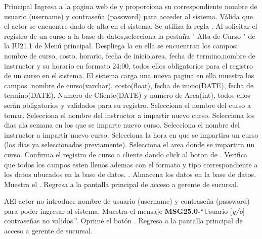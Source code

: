 	\begin{UCtrayectoria}{Principal}
	\UCpaso[\UCactor] Ingresa a la pagina web de \label{CU21.0Login} y proporciona su correspondiente nombre de usuario (username) y contraseña (password) para acceder al sistema.
		\UCpaso Válida que el actor se encuentre dado de alta en el sistema. Se utiliza la regla  .
		\UCpaso[\UCactor] Al solicitar el registro de un curso a la base de datos,selecciona la pestaña " Alta de Curso  " de la IU21.1 de Menú principal.
		\UCpaso Despliega la  en ella se encuentran los campos: nombre de curso, costo, horario, fecha de inicio,area, fecha de termino,nombre de instructor y su  horario en formato 24:00, todos ellos obligatorios para el registro de un curso en el sistema.
		\UCpaso El sistema carga una nueva pagina   en ella muestra los campos: nombre de curso(varchar), costo(float), fecha de inicio(DATE), fecha de termino(DATE), Numero de Cliente(DATE) y numero de Area(int), todos ellos serán obligatorios y validados para su registro. 
	\UCpaso[\UCactor] Selecciona el nombre del curso a tomar.
	\UCpaso[\UCactor] Selecciona el nombre del instructor a impartir nuevo curso.
	\UCpaso[\UCactor] Selecciona los dias ala semana en los que se imparte nuevo curso.
	\UCpaso[\UCactor] Selecciona el nombre del instructor a impartir nuevo curso.
	\UCpaso[\UCactor] Selecciona la hora en que se impartira un curso (los dias ya seleccionados previamente).
	\UCpaso[\UCactor] Selecciona el area donde se impartira un curso.
	\UCpaso[\UCactor] Confirma el registro de curso a cliente dando click al boton  de \label{IU25.1 Inscribir a Curso}.
	\UCpaso Verifica que todos los campos esten llenos ademas con el formato y tipo correspondiente a los datos ubucados en la base de datos.  .
		\UCpaso Almacena los datos en la base de datos.
		\UCpaso Muestra el .
		\UCpaso Regresa a la pantalla principal de acceso a gerente de sucursal.
\end{UCtrayectoria}

\begin{UCtrayectoriaA}{A}{El actor no introduce nombre de usuario (username) y contraseña (password) para poder ingresar al sistema.}
			\UCpaso Muestra el mensaje {\bf MSG25.0-}``Usuario [{\em y/o}] contraseñas no validos.''.
			\UCpaso[\UCactor] Oprimé el botón .
			\UCpaso Regresa a la pantalla principal de acceso a gerente de sucursal.
		\end{UCtrayectoriaA}

